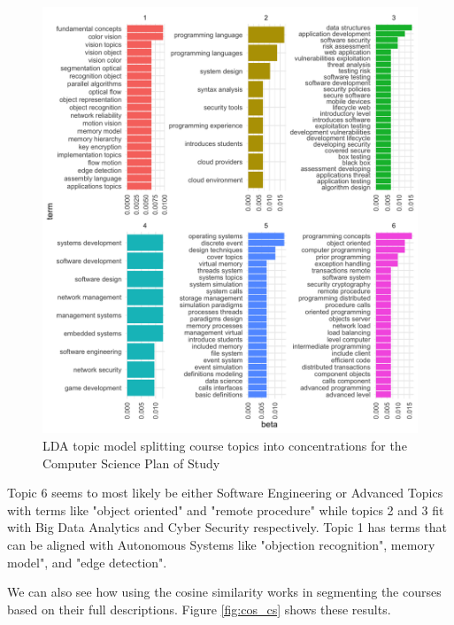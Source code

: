 \begin{figure}[H]
  \centering
  
  \includegraphics[width = .8\textwidth, height = .7\textheight]{Content/images/lda_cs.png}
  \caption{LDA topic model splitting course topics into concentrations for the Computer Science Plan of Study}
  \label{fig:lda_cs}
\end{figure}

Topic 6 seems to most likely be either Software Engineering or Advanced Topics with terms like "object oriented" and "remote procedure" while topics 2 and 3 fit with Big Data 
Analytics and Cyber Security respectively. Topic 1 has terms that can be aligned with Autonomous Systems like "objection recognition", 
memory model", and "edge detection". 

We can also see how using the cosine similarity works in segmenting the courses based on their full descriptions. Figure \ref{fig:cos_cs} 
shows these results. 

